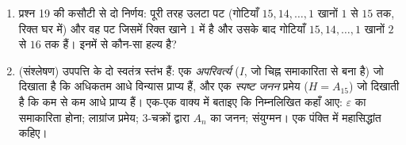 \begin{problem}
\begin{enumerate}[resume]
        और कि कुल $(n - 2)!$ वर्ग हैं --- $n \geq 5$ के लिए $2$ से कहीं अधिक:
        पतले पट पर सम-विषमता वाला अपरिवर्त्य लगभग कुछ नहीं पकड़ता, और
        राज ज्यामिति का चलता है।
  \item प्रश्न 19 की कसौटी से दो निर्णय: पूरी तरह उलटा पट (गोटियाँ
        $15, 14, \dots, 1$ खानों $1$ से $15$ तक, रिक्त घर में) और वह पट जिसमें
        रिक्त खाने $1$ में है और उसके बाद गोटियाँ $15, 14, \dots, 1$ खानों $2$ से
        $16$ तक हैं। इनमें से कौन-सा हल्य है?
  \item (संश्लेषण) उपपत्ति के दो स्वतंत्र स्तंभ हैं: एक
        \emph{अपरिवर्त्य} ($I$, जो चिह्न समाकारिता से बना है) जो
        दिखाता है कि अधिकतम आधे विन्यास प्राप्य हैं, और एक
        \emph{स्पष्ट जनन} प्रमेय ($H = A_{15}$) जो दिखाती है कि कम से कम आधे
        प्राप्य हैं। एक-एक वाक्य में बताइए कि निम्नलिखित कहाँ आए:
        $\varepsilon$ का समाकारिता होना; लाग्रांज प्रमेय; $3$-चक्रों द्वारा
        $A_n$ का जनन; संयुग्मन। एक पंक्ति में महासिद्धांत कहिए।
\end{enumerate}
\end{problem}
